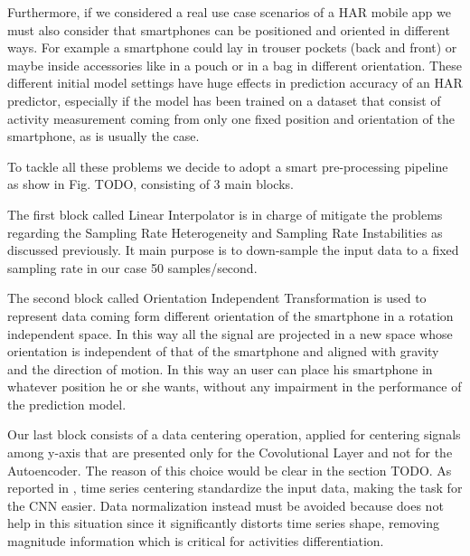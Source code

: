 Furthermore, if we considered a real use case scenarios of a HAR mobile app we must also consider that smartphones can be positioned and oriented in different ways. For example a smartphone could lay in trouser pockets (back and front) or maybe inside accessories like in a pouch or in a bag in different orientation. These different initial model settings have huge effects in prediction accuracy of an HAR predictor, especially if the model has been trained on a dataset that consist of activity measurement coming from only one fixed position and orientation of the smartphone, as is usually the case. 

To tackle all these problems we decide to adopt a smart pre-processing pipeline as show in Fig. TODO, consisting of 3 main blocks.

The first block called Linear Interpolator is in charge of mitigate the problems regarding the Sampling Rate Heterogeneity and Sampling Rate Instabilities as discussed previously. It main purpose is to down-sample the input data to a fixed sampling rate in our case 50 samples/second. 

The second block called Orientation Independent Transformation is used to represent data coming form different orientation of the smartphone in a rotation independent space. In this way all the signal are projected in a new space whose orientation is independent of that of the smartphone and aligned with gravity and the direction of motion. In this way an user can place his smartphone in whatever position he or she wants, without any impairment in the performance of the prediction model.

Our last block consists of a data centering operation, applied for centering signals among y-axis that are presented only for the Covolutional Layer and not for the Autoencoder. The reason of this choice would be clear in the section TODO. As reported in \cite{ignatov2018real}, time series centering standardize the input data, making the task for the CNN easier. Data normalization instead must be avoided because does not help in this situation since it significantly distorts time series shape, removing magnitude information which is critical for activities differentiation.

